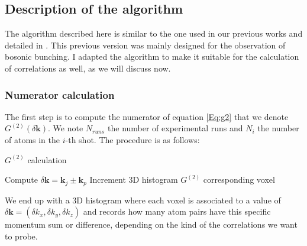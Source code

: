 \subsection{Description of the algorithm}

The algorithm described here is similar to the one used in our previous works \cite{carcy2019momentum,cayla2020} and detailed in \cite{cayla_these,carcy_these}. This previous version was mainly designed for the observation of bosonic bunching. I adapted the algorithm to make it suitable for the calculation of \kmk correlations as well, as we will discuss now.

\subsubsection{Numerator calculation}

The first step is to compute the numerator of equation \ref{Eq:g2} that we denote $G^{(2)}(\delta \bm{k})$. We note $N_{runs}$ the number of experimental runs and $N_{i}$ the number of atoms in the $i$-th shot. The procedure is as follows:


\newpage

\begin{algorithm}[h!]
 \caption{$G^{(2)}$ calculation}
    \begin{algorithmic}
                    \State Compute $\delta \bm{k} = \bm{k}_j \pm \bm{k}_p$
                    \State Increment 3D histogram $G^{(2)}$ corresponding voxel
                \EndFor
            \EndFor
        \EndFor
\end{algorithmic}

\end{algorithm}

\noindent We end up with a 3D histogram where each voxel is associated to a value of $\delta \bm{k} = (\delta k_x,\delta k_y, \delta k_z)$ and records how many atom pairs have this specific momentum sum or difference, depending on the kind of the correlations we want to probe.

